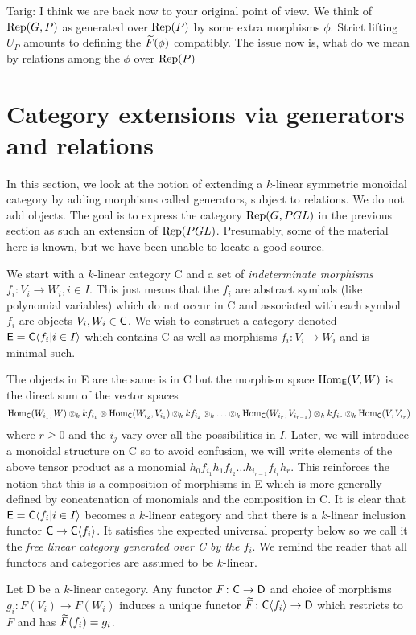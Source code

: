 \documentclass[12pt]{amsart}
\begin{document}
{\red Tarig: I think we are back now to your original point of view. We think of $\operatorname{Rep}(G,P)$ as generated over $\operatorname{Rep}(P)$ by some extra morphisms $\phi$. Strict lifting $U_P$ amounts to defining the  ${\widetilde{F}}(\phi)$ compatibly. The issue now is, what do we mean by relations among the $\phi$ over $\operatorname{Rep}(P)$}

\section{Category extensions via generators and relations}  \label{sec:catext}

In this section, we look at the notion of extending a $k$-linear symmetric monoidal category by adding morphisms called generators, subject to relations. We do not add objects. The goal is to express the category $\operatorname{Rep}(G,PGL)$ in the previous section as such an extension of $\operatorname{Rep}(PGL)$. Presumably, some of the material here is known, but we have been unable to locate a good source. 

We start with a $k$-linear category {\sf C} and a set of {\em indeterminate morphisms} $f_i \colon V_i \to W_i, i \in I$. This just means that the $f_i$ are abstract symbols (like polynomial variables) which do not occur in {\sf C} and associated with each symbol $f_i$ are objects $V_i, W_i \in {\sf C}$. We wish to construct a category denoted ${\sf E} = {\sf C}\langle f_i|i \in I\rangle$ which contains {\sf C} as well as morphisms $f_i \colon V_i \to W_i$ and is minimal such. 

The objects in {\sf E} are the same is in {\sf C} but the morphism space  $\operatorname{Hom}_{\sf E}(V,W)$ is the direct sum of the vector spaces 
$$
\operatorname{Hom}_{\sf C}(W_{i_1},W) \otimes_k kf_{i_1} \otimes \operatorname{Hom}_{\sf C}(W_{i_2},V_{i_1}) \otimes_k kf_{i_2} \otimes_k \ldots \otimes_k\operatorname{Hom}_{\sf C}(W_{i_r},V_{i_{r-1}}) \otimes_k kf_{i_r} \otimes_k \operatorname{Hom}_{\sf C}(V,V_{i_r})
$$
where $r \geq 0$ and the $i_j$ vary over all the possibilities in $I$. Later, we will introduce a monoidal structure on {\sf C} so to avoid confusion, we will write elements of the above tensor product as a monomial $h_0f_{i_1}h_1 f_{i_2}\ldots h_{i_{r-1}}f_{i_r}h_r$. This reinforces the notion that this is a composition of morphisms in {\sf E} which is more generally defined by concatenation of monomials and the composition in {\sf C}. It is clear that ${\sf E} = {\sf C}\langle f_i|i \in I\rangle$ becomes a $k$-linear category and that there is a $k$-linear inclusion functor ${\sf C} \to {\sf C}\langle f_i\rangle$. It satisfies the expected universal property below so we call it the {\em free linear category generated over {\sf C} by the $f_i$}. We remind the reader that all functors and categories are assumed to be $k$-linear. 
\begin{proposition} \label{prop:freelinearcat}
Let {\sf D} be a $k$-linear category. Any functor $F \colon {\sf C} \to {\sf D}$ and choice of morphisms $g_i\colon F(V_i) \to F(W_i)$ induces a unique functor ${\widetilde{F}} \colon {\sf C}\langle f_i \rangle \to {\sf D}$ which restricts to $F$ and has ${\widetilde{F}}(f_i) = g_i$. 
\end{proposition}
\end{document}
